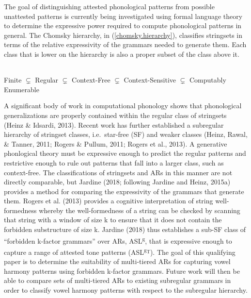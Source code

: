 \documentclass[,doc,floatsintext]{apa6}
\theoremstyle{definition}
\theoremstyle{definition}
\theoremstyle{definition}
\theoremstyle{remark}
\begin{document}
The goal of distinguishing attested phonological patterns from possible
unattested patterns is currently being investigated using formal
language theory to determine the expressive power required to compute
phonological patterns in general. The Chomsky hierarchy, in
(\ref{chomsky.hierarchy}), classifies stringsets in terms of the
relative expressivity of the grammars needed to generate them. Each
class that is lower on the hierarchy is also a proper subset of the
class above it.

\begin{exe}
\label{chomsky.hierarchy} \\ 
Finite $\subsetneq$ Regular $\subsetneq$ Context-Free $\subsetneq$ Context-Sensitive $\subsetneq$ Computably Enumerable
\end{exe}

A significant body of work in computational phonology shows that
phonological generalizations are properly contained within the regular
class of stringsets (Heinz \& Idsardi, 2013). Recent work has further
established a subregular hierarchy of stringset classes, i.e.~star-free
(SF) and weaker classes (Heinz, Rawal, \& Tanner, 2011; Rogers \&
Pullum, 2011; Rogers et al., 2013). A generative phonlogical theory must
be expressive enough to predict the regular patterns and restrictive
enough to rule out patterns that fall into a larger class, such as
context-free. The classifications of stringsets and ARs in this manner
are not directly comparable, but Jardine (2018; following Jardine and
Heinz, 2015a) provides a method for comparing the expressivity of the
grammars that generate them. Rogers et al. (2013) provides a cognitive
interpretation of string well-formedness whereby the well-formedness of
a string can be checked by scanning that string with a window of size k
to ensure that it does not contain the forbidden substructure of size k.
Jardine (2018) thus establishes a sub-SF class of \enquote{forbidden
k-factor grammars} over ARs, ASL\textsuperscript{g}, that is expressive
enough to capture a range of attested tone patterns
(ASL\textsuperscript{g\textsubscript{T}}). The goal of this qualifying
paper is to determine the suitability of multi-tiered ARs for capturing
vowel harmony patterns using forbidden k-factor grammars. Future work
will then be able to compare sets of multi-tiered ARs to existing
subregular grammars in order to classify vowel harmony patterns with
respect to the subregular hierarchy.
\end{document}
